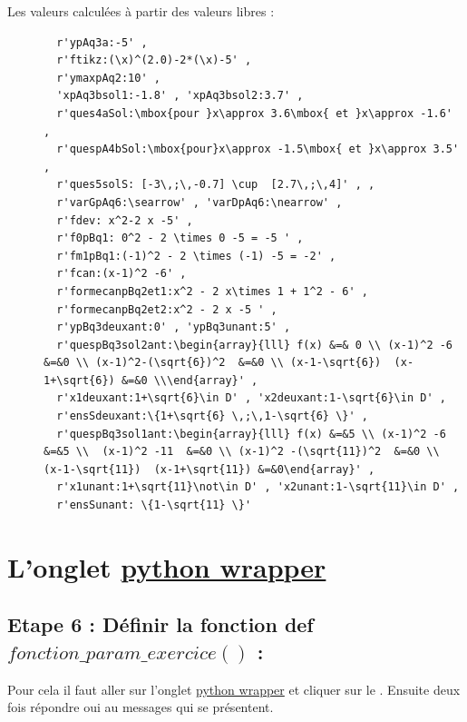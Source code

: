 {\begin{description}
 \item[Les valeurs calculées à partir des valeurs libres : ] 
 \begin{verbatim}
  r'ypAq3a:-5' , 
  r'ftikz:(\x)^(2.0)-2*(\x)-5' , 
  r'ymaxpAq2:10' ,  
  'xpAq3bsol1:-1.8' , 'xpAq3bsol2:3.7' ,
  r'ques4aSol:\mbox{pour }x\approx 3.6\mbox{ et }x\approx -1.6' ,  
  r'quespA4bSol:\mbox{pour}x\approx -1.5\mbox{ et }x\approx 3.5' , 
  r'ques5solS: [-3\,;\,-0.7] \cup  [2.7\,;\,4]' , , 
  r'varGpAq6:\searrow' , 'varDpAq6:\nearrow' ,  
  r'fdev: x^2-2 x -5' , 
  r'f0pBq1: 0^2 - 2 \times 0 -5 = -5 ' , 
  r'fm1pBq1:(-1)^2 - 2 \times (-1) -5 = -2' , 
  r'fcan:(x-1)^2 -6' , 
  r'formecanpBq2et1:x^2 - 2 x\times 1 + 1^2 - 6' , 
  r'formecanpBq2et2:x^2 - 2 x -5 ' , 
  r'ypBq3deuxant:0' , 'ypBq3unant:5' , 
  r'quespBq3sol2ant:\begin{array}{lll} f(x) &=& 0 \\ (x-1)^2 -6  &=&0 \\ (x-1)^2-(\sqrt{6})^2  &=&0 \\ (x-1-\sqrt{6})  (x-1+\sqrt{6}) &=&0 \\\end{array}' , 
  r'x1deuxant:1+\sqrt{6}\in D' , 'x2deuxant:1-\sqrt{6}\in D' , 
  r'ensSdeuxant:\{1+\sqrt{6} \,;\,1-\sqrt{6} \}' , 
  r'quespBq3sol1ant:\begin{array}{lll} f(x) &=&5 \\ (x-1)^2 -6  &=&5 \\  (x-1)^2 -11  &=&0 \\ (x-1)^2 -(\sqrt{11})^2  &=&0 \\ (x-1-\sqrt{11})  (x-1+\sqrt{11}) &=&0\end{array}' ,
  r'x1unant:1+\sqrt{11}\not\in D' , 'x2unant:1-\sqrt{11}\in D' , 
  r'ensSunant: \{1-\sqrt{11} \}'    
 \end{verbatim}

\end{description}


\section{L'onglet \underline{python wrapper}}
\subsection{Etape 6 : Définir la fonction def $fonction\_param\_exercice()$ : }

Pour cela il faut aller sur l'onglet \underline{python wrapper} et cliquer sur le . 
Ensuite deux fois répondre oui au messages qui se présentent. 

}
